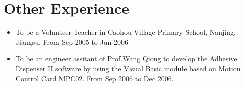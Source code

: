 \documentclass[11pt,a4paper,sans]{moderncv}        %
\begin{document}
\section{Other Experience}

\vspace{6pt}

\begin{itemize}

\item{To be a Volunteer Teacher in Caohou Village Primary School, Nanjing, Jiangsu. From Sep 2005 to Jun 2006}

\vspace{6pt}

\item{To be an engineer assitant of Prof.Wang Qiong to develop the Adhesive Dispenser II software by using the Visual Basic module based on Motion Control Card MPC02. From Sep 2006 to Dec 2006. }

\end{itemize}


\nocite{*}



\end{document}
